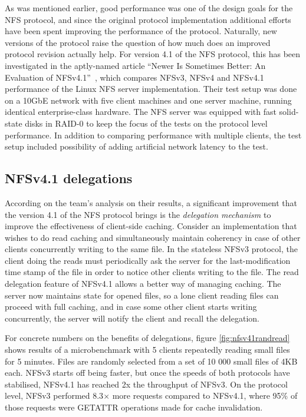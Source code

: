 As was mentioned earlier, good performance was one of the design goals for the NFS protocol,
and since the original protocol implementation additional efforts have been spent improving the performance of the protocol.
Naturally, new versions of the protocol raise the question of how much does an improved protocol revision actually help.
For version 4.1 of the NFS protocol, this has been investigated in the aptly-named article ``Newer Is Sometimes Better: An Evaluation of NFSv4.1''~\cite{NFSv4Better}, which compares NFSv3, NFSv4 and NFSv4.1 performance of the Linux NFS server implementation.
Their test setup was done on a 10GbE network with five client machines and one server machine, running identical enterprise-class hardware.
The NFS server was equipped with fast solid-state disks in RAID-0 to keep the focus of the tests on the protocol level performance.
In addition to comparing performance with multiple clients, the test setup included possibility of adding artificial network latency to the test.

\subsection{NFSv4.1 delegations}
According on the team's analysis on their results, a significant improvement that the version 4.1 of the NFS protocol brings is the \emph{delegation
mechanism} to improve the effectiveness of client-side caching.
Consider an implementation that wishes to do read caching and simultaneously maintain coherency in case of other clients
concurrently writing to the same file.
In the stateless NFSv3 protocol, the client doing the reads must periodically ask the server for the last-modification time stamp of the file in order to notice other clients writing to the file.
The read delegation feature of NFSv4.1 allows a better way of managing caching.
The server now maintains state for opened files, so a lone client reading files can proceed with full caching,
and in case some other client starts writing concurrently, the server will notify the client and recall the delegation.

For concrete numbers on the benefits of delegations,
figure \ref{fig:nfsv41randread} shows results of a microbenchmark with 5 clients repeatedly reading small files for 5 minutes.
Files are randomly selected from a set of 10 000 small files of 4KB each.
NFSv3 starts off being faster, but once the speeds of both protocols have stabilised,
NFSv4.1 has reached 2x the throughput of NFSv3.
On the protocol level, NFSv3 performed 8.3$\times$ more requests compared to NFSv4.1,
where 95\% of those requests were GETATTR operations made for cache invalidation.

